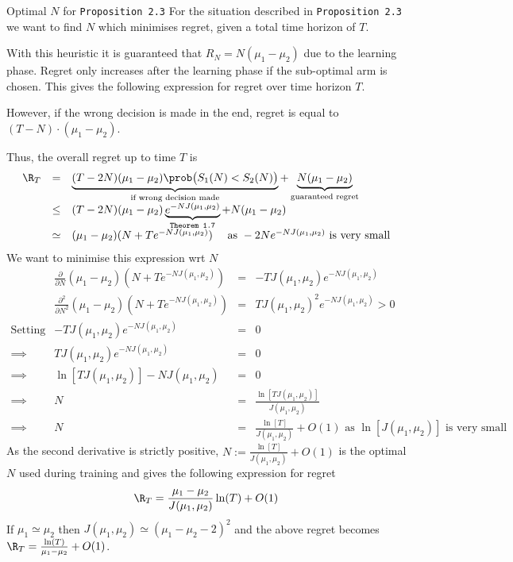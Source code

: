 \documentclass[11pt,a4paper]{article}
\begin{document}
  \begin{proposition}{Optimal $N$ for \texttt{Proposition 2.3} }
    For the situation described in \texttt{Proposition 2.3} we want to find $N$ which minimises regret, given a total time horizon of $T$.
    \par With this heuristic it is guaranteed that $R_N=N(\mu_1-\mu_2)$ due to the learning phase. Regret only increases after the learning phase if the sub-optimal arm is chosen. This gives the following expression for regret over time horizon $T$.
    \par However, if the wrong decision is made in the end, regret is equal to $(T-N)\cdot(\mu_1-\mu_2)$.
    \par Thus, the overall regret up to time $T$ is
    \[\begin{array}{rcl}
      \R_T&=&\underbrace{(T-2N)(\mu_1-\mu_2)\prob\big(S_1(N)<S_2(N)\big)}_{\tiny\text{if wrong decision made}}+\underbrace{N(\mu_1-\mu_2)}_{\tiny\text{guaranteed regret}}\\
      &\leq&(T-2N)(\mu_1-\mu_2)\underbrace{e^{-NJ(\mu_1,\mu_2)}}_\texttt{Theorem 1.7}+N(\mu_1-\mu_2)\\
      &\simeq&(\mu_1-\mu_2)(N+Te^{-NJ(\mu_1,\mu_2)})\quad\text{ as } -2Ne^{-NJ(\mu_1,\mu_2)}\text{ is very small}
    \end{array}\]
    We want to minimise this expression wrt $N$
    \[\begin{array}{rrcl}
      &\frac{\partial }{\partial N}(\mu_1-\mu_2)(N+Te^{-NJ(\mu_1,\mu_2)})&=&-TJ(\mu_1,\mu_2)e^{-NJ(\mu_1,\mu_2)}\\
      &\frac{\partial^2 }{\partial N^2}(\mu_1-\mu_2)(N+Te^{-NJ(\mu_1,\mu_2)})&=&TJ(\mu_1,\mu_2)^2e^{-NJ(\mu_1,\mu_2)}>0\\
      \text{Setting}&-TJ(\mu_1,\mu_2)e^{-NJ(\mu_1,\mu_2)}&=&0\\
      \implies&TJ(\mu_1,\mu_2)e^{-NJ(\mu_1,\mu_2)}&=&0\\
      \implies&\ln[TJ(\mu_1,\mu_2)]-NJ(\mu_1,\mu_2)&=&0\\
      \implies&N&=&\frac{\ln[TJ(\mu_1,\mu_2)]}{J(\mu_1,\mu_2)}\\
      \implies&N&=&\frac{\ln[T]}{J(\mu_1,\mu_2)}+O(1)\text{ as }\ln[J(\mu_1,\mu_2)]\text{ is very small}
    \end{array}\]
    As the second derivative is strictly positive, $N:=\frac{\ln[T]}{J(\mu_1,\mu_2)}+O(1)$ is the optimal $N$ used during training and gives the following expression for regret
    \[ \R_T=\frac{\mu_1-\mu_2}{J(\mu_1,\mu_2)}\ln(T)+O(1) \]
    If $\mu_1\simeq\mu_2$ then $J(\mu_1,\mu_2)\simeq(\mu_1-\mu_2-2)^2$ and the above regret becomes $\R_T=\frac{\ln(T)}{\mu_1-\mu_2}+O(1)$.
  \end{proposition}
\end{document}
